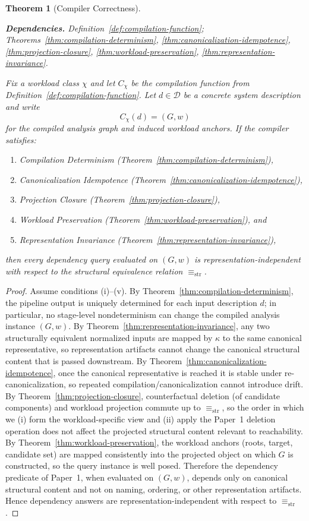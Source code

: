 \documentclass[11pt]{article}
\newtheorem{theorem}{Theorem}
\newcommand{\deps}[1]{\par\noindent\textbf{Dependencies.} #1\par}
\begin{document}
\begin{theorem}[Compiler Correctness]
\label{thm:compiler-correctness}
\deps{Definition~\ref{def:compilation-function}; Theorems~\ref{thm:compilation-determinism}, \ref{thm:canonicalization-idempotence}, \ref{thm:projection-closure}, \ref{thm:workload-preservation}, \ref{thm:representation-invariance}.}
Fix a workload class $\chi$ and let $C_\chi$ be the compilation function from Definition~\ref{def:compilation-function}.
Let $d\in\mathcal D$ be a concrete system description and write
\[
C_\chi(d)=(G,w)
\]
for the compiled analysis graph and induced workload anchors.
If the compiler satisfies:
\begin{enumerate}[label=(\roman*),leftmargin=*]
    \item Compilation Determinism (Theorem~\ref{thm:compilation-determinism}),
    \item Canonicalization Idempotence (Theorem~\ref{thm:canonicalization-idempotence}),
    \item Projection Closure (Theorem~\ref{thm:projection-closure}),
    \item Workload Preservation (Theorem~\ref{thm:workload-preservation}), and
    \item Representation Invariance (Theorem~\ref{thm:representation-invariance}),
\end{enumerate}
then every dependency query evaluated on $(G,w)$ is representation-independent with respect to the structural equivalence relation $\equiv_{\mathrm{str}}$.
\end{theorem}
\begin{proof}
Assume conditions (i)--(v).
By Theorem~\ref{thm:compilation-determinism}, the pipeline output is uniquely determined for each input description $d$; in particular, no stage-level nondeterminism can change the compiled analysis instance $(G,w)$.
By Theorem~\ref{thm:representation-invariance}, any two structurally equivalent normalized inputs are mapped by $\kappa$ to the same canonical representative, so representation artifacts cannot change the canonical structural content that is passed downstream.
By Theorem~\ref{thm:canonicalization-idempotence}, once the canonical representative is reached it is stable under re-canonicalization, so repeated compilation/canonicalization cannot introduce drift.
By Theorem~\ref{thm:projection-closure}, counterfactual deletion (of candidate components) and workload projection commute up to $\equiv_{\mathrm{str}}$, so the order in which we (i) form the workload-specific view and (ii) apply the Paper~1 deletion operation does not affect the projected structural content relevant to reachability.
By Theorem~\ref{thm:workload-preservation}, the workload anchors (roots, target, candidate set) are mapped consistently into the projected object on which $G$ is constructed, so the query instance is well posed.
Therefore the dependency predicate of Paper~1, when evaluated on $(G,w)$, depends only on canonical structural content and not on naming, ordering, or other representation artifacts.
Hence dependency answers are representation-independent with respect to $\equiv_{\mathrm{str}}$.
\end{proof}
\end{document}
